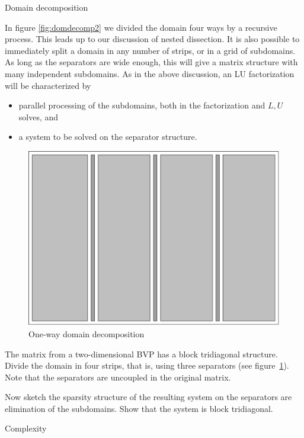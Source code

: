  {Domain decomposition}

In figure \ref{fig:domdecomp2} we divided the domain four ways by a
recursive process. This leads up to our discussion of nested
dissection. It is also possible to immediately split a domain in any
number of strips, or in a grid of subdomains. As long as the
separators are wide enough, this will give a matrix structure with
many independent subdomains.
As in the above discussion, an LU factorization will be characterized
by
\begin{itemize}
\item parallel processing of the subdomains, both in the factorization
  and $L,U$ solves, and
\item a system to be solved on the separator structure.
\end{itemize}

\begin{figure}[ht]
  \includegraphics[scale=.16]{graphics-public/domdecomp4}
  \caption{One-way domain decomposition}
  \label{fig:domdecomp4}
\end{figure}
\begin{exercise}
  The matrix from a two-dimensional \ac{BVP} has a block tridiagonal
  structure. Divide the domain in four strips, that is, using three
  separators (see figure~\ref{fig:domdecomp4}). Note that the
  separators are uncoupled in the original matrix.

  Now sketch the sparsity structure of the resulting system on the
  separators are elimination of the subdomains. Show that the system
  is block tridiagonal.
\end{exercise}


 {Complexity}

